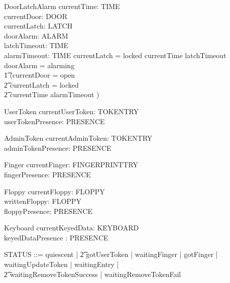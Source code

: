 \begin{schema}{DoorLatchAlarm}
	currentTime: TIME
\\	currentDoor: DOOR
\\	currentLatch: LATCH
\\	doorAlarm: ALARM
\\	latchTimeout: TIME
\\	alarmTimeout: TIME
\where
	currentLatch = locked \iff currentTime \geq latchTimeout
\\	doorAlarm = alarming \iff 
\\ \t1		(currentDoor = open
\\ \t2			\land currentLatch = locked
\\ \t2			\land currentTime \geq alarmTimeout
			)
\end{schema}

\begin{schema}{UserToken}
	currentUserToken: TOKENTRY
\\	userTokenPresence: PRESENCE
\end{schema}

\begin{schema}{AdminToken}
	currentAdminToken: TOKENTRY
\\	adminTokenPresence: PRESENCE
\end{schema}

\begin{schema}{Finger}
	currentFinger: FINGERPRINTTRY
\\	fingerPresence: PRESENCE
\end{schema}

\begin{schema}{Floppy}
	currentFloppy: FLOPPY
\\      writtenFloppy: FLOPPY
\\	floppyPresence: PRESENCE
\end{schema}

\begin{schema}{Keyboard}
        currentKeyedData: KEYBOARD
\\      keyedDataPresence : PRESENCE
\end{schema}  

\begin{zed}
	STATUS ::= quiescent | 
\also \t2          gotUserToken |  waitingFinger | gotFinger | waitingUpdateToken | waitingEntry |
\\ \t2          waitingRemoveTokenSuccess | waitingRemoveTokenFail 
\also
\end{zed}

